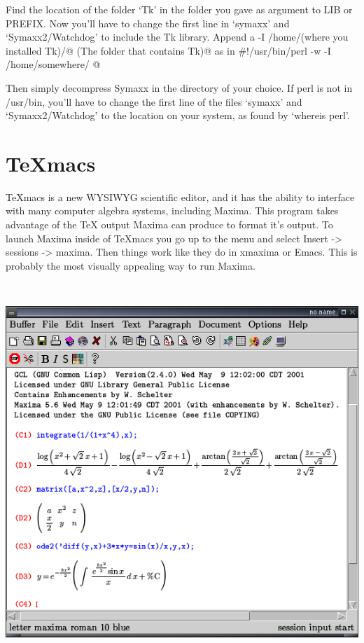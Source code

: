 Find the location of the folder `Tk' in the folder you gave as argument to LIB or
PREFIX. Now you'll have to change the first line in `symaxx' and `Symaxx2/Watchdog'
to include the Tk library. Append a
\verb@-I /home/(where you installed Tk)/@ \verb@(The folder that contains Tk)@
as in
\verb@ #!/usr/bin/perl -w -I /home/somewhere/ @

Then simply decompress Symaxx in the directory of your choice. If perl is not in /usr/bin, you'll have to change the first line of the files `symaxx'
and `Symaxx2/Watchdog' to the location on your system, as found by `whereis
perl'.

\section{\TeX{}macs}

\TeX{}macs is a new WYSIWYG scientific editor, and it has the ability
to interface with many computer algebra systems, including Maxima.
This program takes advantage of the \TeX{} output Maxima can produce
to format it's output. To launch Maxima inside of \TeX{}macs you go
up to the menu and select Insert -> sessions -> maxima. Then things
work like they do in xmaxima or Emacs. This is probably the most visually
appealing way to run Maxima.

~

{\centering \includegraphics{images/texmacs} \par }
